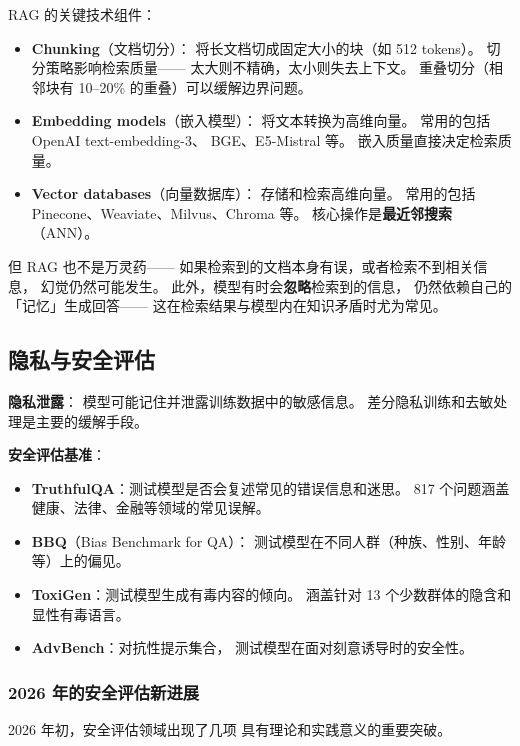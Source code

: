 RAG 的关键技术组件：
\begin{itemize}[noitemsep]
  \item \textbf{Chunking}（文档切分）：
        将长文档切成固定大小的块（如 512 tokens）。
        切分策略影响检索质量——
        太大则不精确，太小则失去上下文。
        重叠切分（相邻块有 10--20\% 的重叠）可以缓解边界问题。
  \item \textbf{Embedding models}（嵌入模型）：
        将文本转换为高维向量。
        常用的包括 OpenAI text-embedding-3、
        BGE、E5-Mistral 等。
        嵌入质量直接决定检索质量。
  \item \textbf{Vector databases}（向量数据库）：
        存储和检索高维向量。
        常用的包括 Pinecone、Weaviate、Milvus、Chroma 等。
        核心操作是\textbf{最近邻搜索}（ANN）。
\end{itemize}

但 RAG 也不是万灵药——
如果检索到的文档本身有误，或者检索不到相关信息，
幻觉仍然可能发生。
此外，模型有时会\textbf{忽略}检索到的信息，
仍然依赖自己的「记忆」生成回答——
这在检索结果与模型内在知识矛盾时尤为常见。

\subsection{隐私与安全评估}

\textbf{隐私泄露}：
模型可能记住并泄露训练数据中的敏感信息。
差分隐私训练和去敏处理是主要的缓解手段。

\textbf{安全评估基准}：
\begin{itemize}[noitemsep]
  \item \textbf{TruthfulQA}：测试模型是否会复述常见的错误信息和迷思。
        817 个问题涵盖健康、法律、金融等领域的常见误解。
  \item \textbf{BBQ}（Bias Benchmark for QA）：
        测试模型在不同人群（种族、性别、年龄等）上的偏见。
  \item \textbf{ToxiGen}：测试模型生成有毒内容的倾向。
        涵盖针对 13 个少数群体的隐含和显性有毒语言。
  \item \textbf{AdvBench}：对抗性提示集合，
        测试模型在面对刻意诱导时的安全性。
\end{itemize}

\subsubsection{2026 年的安全评估新进展}

2026 年初，安全评估领域出现了几项
具有理论和实践意义的重要突破。

